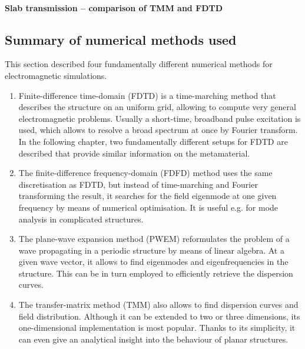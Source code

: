 \paragraph{Slab transmission -- comparison of TMM and FDTD} %
\subsection{Summary of numerical methods used} %
This section described four fundamentally different numerical methods for electromagnetic simulations. 
\begin{enumerate}
\item{Finite-difference time-domain (FDTD) is a time-marching method that describes the structure on an uniform grid, allowing to compute very general electromagnetic problems. Usually a short-time, broadband pulse excitation is used, which allows to resolve a broad spectrum at once by Fourier transform. In the following chapter, two fundamentally different setups for FDTD are described that provide similar information on the metamaterial.} 
\item{The finite-difference frequency-domain (FDFD) method uses the same discretisation as FDTD, but instead of time-marching and Fourier transforming the result, it searches for the field eigenmode at one given frequency by means of numerical optimisation. It is useful e.g. for mode analysis in complicated structures.} 
\item{The plane-wave expansion method (PWEM) reformulates the problem of a wave propagating in a periodic structure by means of linear algebra. At a given wave vector, it allows to find eigenmodes and eigenfrequencies in the structure. This can be in turn employed to efficiently retrieve the dispersion curves.} 
\item{The transfer-matrix method (TMM) also allows to find dispersion curves and field distribution. Although it can be extended to two or three dimensions, its one-dimensional implementation is most popular. Thanks to its simplicity, it can even give an analytical insight into the behaviour of planar structures.} 
\end{enumerate}
